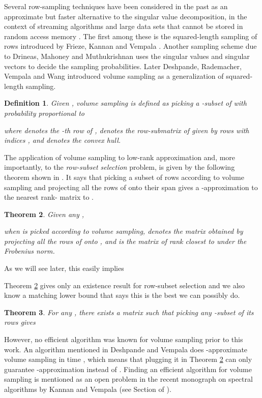 \documentclass[11pt]{article}
\newtheorem{theorem}{Theorem}
\newtheorem{definition}[theorem]{Definition}
\begin{document}
Several row-sampling techniques have been considered in the past as an approximate but faster alternative to the singular value decomposition, in the context of streaming algorithms and large data sets that cannot be stored in random access memory \cite{FKV,DMM,DRVW}. The first among these is the squared-length sampling of rows introduced by Frieze, Kannan and Vempala \cite{FKV}. Another sampling scheme due to Drineas, Mahoney and Muthukrishnan \cite{DMM} uses the singular values and singular vectors to decide the sampling probabilities. Later Deshpande, Rademacher, Vempala and Wang \cite{DRVW} introduced volume sampling as a generalization of squared-length sampling.
\begin{definition} \label{def:vol-sampling}
Given , volume sampling is defined as picking a -subset  of  with probability proportional to

where  denotes the -th row of ,  denotes the row-submatrix of  given by rows with indices , and  denotes the convex hull.
\end{definition}

The application of volume sampling to low-rank approximation and, more importantly, to the \emph{row-subset selection} problem, is given by the following theorem shown in \cite{DRVW}. It says that picking a subset of  rows according to volume sampling and projecting all the rows of  onto their span gives a -approximation to the nearest rank- matrix to .
\begin{theorem} \cite{DRVW} \label{thm:vol-sampling}
Given any ,

when  is picked according to volume sampling,  denotes the matrix obtained by projecting all the rows of  onto , and  is the matrix of rank  closest to  under the Frobenius norm.
\end{theorem}
As we will see later, this easily implies

Theorem \ref{thm:vol-sampling} gives only an existence result for row-subset selection and we also know a matching lower bound that says this is the best we can possibly do.
\begin{theorem} \cite{DRVW} \label{thm:DRVW-lower}
For any , there exists a matrix  such that picking any -subset  of its rows gives

\end{theorem}

However, no efficient algorithm was known for volume sampling prior to this work. An algorithm mentioned in Deshpande and Vempala \cite{DV} does -approximate volume sampling in time , which means that plugging it in Theorem \ref{thm:vol-sampling} can only guarantee -approximation instead of . Finding an efficient algorithm for volume sampling is mentioned as an open problem in the recent monograph on spectral algorithms by Kannan and Vempala (see Section  of \cite{KV}).
\end{document}

